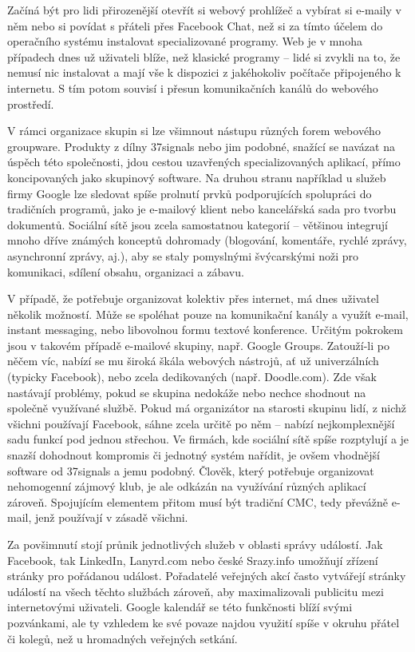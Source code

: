 \documentclass[12pt,oneside,final]{fithesis2}
\begin{document}
Začíná být pro lidi přirozenější otevřít si webový prohlížeč a vybírat si e-maily v něm nebo si povídat s přáteli přes Facebook Chat, než si za tímto účelem do operačního systému instalovat specializované programy. Web je v mnoha případech dnes už uživateli blíže, než klasické programy -- lidé si zvykli na to, že nemusí nic instalovat a mají vše k dispozici z jakéhokoliv počítače připojeného k internetu. S tím potom souvisí i přesun komunikačních kanálů do webového prostředí.

V rámci organizace skupin si lze všimnout nástupu různých forem webového groupware. Produkty z dílny 37signals nebo jim podobné, snažící se navázat na úspěch této společnosti, jdou cestou uzavřených specializovaných aplikací, přímo koncipovaných jako skupinový software. Na druhou stranu například u služeb firmy Google lze sledovat spíše prolnutí prvků podporujících spolupráci do tradičních programů, jako je e-mailový klient nebo kancelářská sada pro tvorbu dokumentů. Sociální sítě jsou zcela samostatnou kategorií -- většinou integrují mnoho dříve známých konceptů dohromady (blogování, komentáře, rychlé zprávy, asynchronní zprávy, aj.), aby se staly pomyslnými švýcarskými noži pro komunikaci, sdílení obsahu, organizaci a zábavu.

V případě, že potřebuje organizovat kolektiv přes internet, má dnes uživatel několik možností. Může se spoléhat pouze na komunikační kanály a využít e-mail, instant messaging, nebo libovolnou formu textové konference. Určitým pokrokem jsou v takovém případě e-mailové skupiny, např. Google Groups. Zatouží-li po něčem víc, nabízí se mu široká škála webových nástrojů, ať už univerzálních (typicky Facebook), nebo zcela dedikovaných (např. Doodle.com). Zde však nastávají problémy, pokud se skupina nedokáže nebo nechce shodnout na společně využívané službě. Pokud má organizátor na starosti skupinu lidí, z nichž všichni používají Facebook, sáhne zcela určitě po něm -- nabízí nejkomplexnější sadu funkcí pod jednou střechou. Ve firmách, kde sociální sítě spíše rozptylují a je snazší dohodnout kompromis či jednotný systém nařídit, je ovšem vhodnější software od 37signals a jemu podobný. Člověk, který potřebuje organizovat nehomogenní zájmový klub, je ale odkázán na využívání různých aplikací zároveň. Spojujícím elementem přitom musí být tradiční CMC, tedy převážně e-mail, jenž používají v zásadě všichni.

Za povšimnutí stojí průnik jednotlivých služeb v oblasti správy událostí. Jak Facebook, tak LinkedIn, Lanyrd.com nebo české Srazy.info umožňují zřízení stránky pro pořádanou událost. Pořadatelé veřejných akcí často vytvářejí stránky událostí na všech těchto službách zároveň, aby maximalizovali publicitu mezi internetovými uživateli. Google kalendář se této funkčnosti blíží svými pozvánkami, ale ty vzhledem ke své povaze najdou využití spíše v okruhu přátel či kolegů, než u hromadných veřejných setkání.
\end{document}
